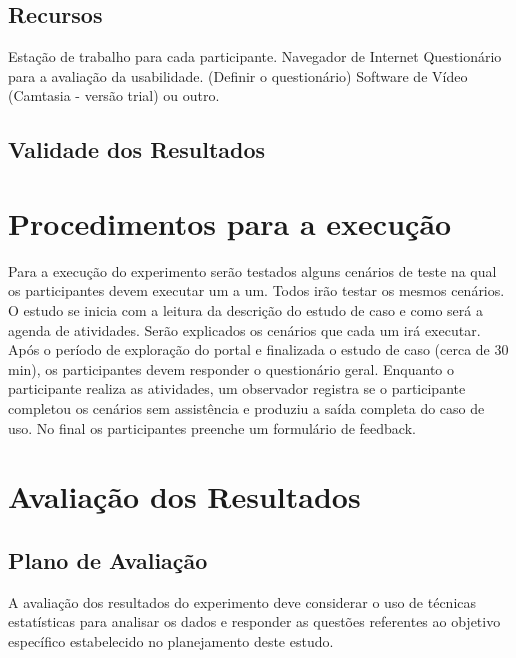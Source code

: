 
\subsection{Recursos}

Estação de trabalho para cada participante.
Navegador de Internet
Questionário para a avaliação da usabilidade. (Definir o questionário)
Software de Vídeo (Camtasia - versão trial) ou outro.

\subsection{Validade dos Resultados}


\section{Procedimentos para a execução}

Para a execução do experimento serão testados alguns cenários de teste na qual os participantes devem executar um a um. Todos irão testar os mesmos cenários.
O estudo se inicia com a leitura da descrição do estudo de caso e como será a agenda de atividades. Serão explicados os cenários que cada um irá executar.
Após o período de exploração do portal e finalizada o estudo de caso (cerca de 30 min), os participantes devem responder o questionário geral.
Enquanto o participante realiza as atividades, um observador registra se o participante completou os cenários sem assistência e produziu a saída completa do caso de uso.
No final os participantes preenche um formulário de feedback.

\section{Avaliação dos Resultados}

\subsection{Plano de Avaliação}


A avaliação dos resultados do experimento deve considerar o uso de técnicas estatísticas para analisar os dados e responder as questões referentes ao objetivo específico estabelecido no planejamento deste estudo.





